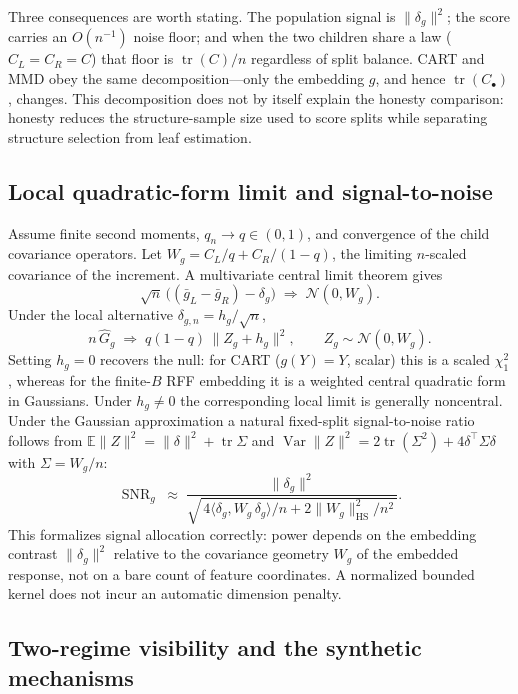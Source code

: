 \documentclass[11pt]{article}
\theoremstyle{remark}
\begin{document}
Three consequences are worth stating. The population signal is $\|\delta_g\|^2$;
the score carries an $O(n^{-1})$ noise floor; and when the two children share a
law ($C_L=C_R=C$) that floor is $\operatorname{tr}(C)/n$ regardless of split
balance.  CART and MMD obey the same decomposition---only the embedding $g$, and
hence $\operatorname{tr}(C_\bullet)$, changes.  This decomposition does not by
itself explain the honesty comparison: honesty reduces the structure-sample
size used to score splits while separating structure selection from leaf
estimation.

\subsection{Local quadratic-form limit and signal-to-noise}

Assume finite second moments, $q_n\to q\in(0,1)$, and convergence of the child
covariance operators.  Let $W_g = C_L/q + C_R/(1-q)$, the limiting $n$-scaled
covariance of the increment.  A multivariate central limit theorem gives
\[
  \sqrt n\,\bigl((\bar g_L-\bar g_R) - \delta_g\bigr)
  \;\Rightarrow\; \mathcal N(0, W_g).
\]
Under the local alternative $\delta_{g,n}=h_g/\sqrt n$,
\[
  n\,\widehat G_g \;\Rightarrow\; q(1-q)\,\|Z_g + h_g\|^2,
  \qquad Z_g \sim \mathcal N(0,W_g) .
\]
Setting $h_g=0$ recovers the null: for CART ($g(Y)=Y$, scalar) this is a scaled
$\chi^2_1$, whereas for the finite-$B$ RFF embedding it is a weighted central
quadratic form in Gaussians.  Under $h_g\ne0$ the corresponding local
limit is generally noncentral.  Under the Gaussian approximation a natural
fixed-split signal-to-noise
ratio follows from $\mathbb E\|Z\|^2=\|\delta\|^2+\operatorname{tr}\Sigma$ and
$\operatorname{Var}\|Z\|^2 = 2\operatorname{tr}(\Sigma^2)+4\delta^\top\Sigma\delta$
with $\Sigma=W_g/n$:
\[
  \operatorname{SNR}_g
  \;\approx\;
  \frac{\|\delta_g\|^2}
       {\sqrt{\,4\langle \delta_g, W_g\,\delta_g\rangle/n
              + 2\|W_g\|_{\mathrm{HS}}^2/n^2\,}} .
\]
This formalizes signal allocation correctly: power depends on the embedding
contrast $\|\delta_g\|^2$ relative to the covariance geometry $W_g$ of the
embedded response, not on a bare count of feature coordinates.  A normalized
bounded kernel does not incur an automatic dimension penalty.

\subsection{Two-regime visibility and the synthetic mechanisms}
\end{document}
